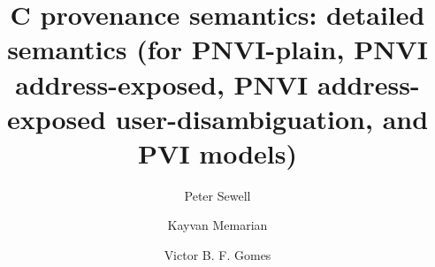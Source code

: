 \documentclass[acmsmall,review,screen]{acmart}\settopmatter{printfolios=true,printccs=false,printacmref=false}
\newif\ifWGfourteennumber
\begin{document}
\ifWGfourteennumber
\fancypagestyle{firstpagestyle}{%
\fancyhf{} %
\fancyhead[C]{ISO/IEC JTC1/SC22/WG14 N2311, 2018-11-09} %
\renewcommand{\headrulewidth}{0pt}
\renewcommand{\footrulewidth}{0pt}}
\thispagestyle{plain}
\fi

\title[C provenance semantics: detailed semantics]{C provenance semantics: detailed
semantics (for PNVI-plain, PNVI address-exposed, PNVI address-exposed 
user-disambiguation, and PVI models)}


\authorsaddresses{}

\author{Peter Sewell}

 \author{Kayvan Memarian}
% 
% 
 \author{Victor B. F. Gomes}

\renewcommand{\shortauthors}{Sewell, Memarian, Gomes}

\end{document}
